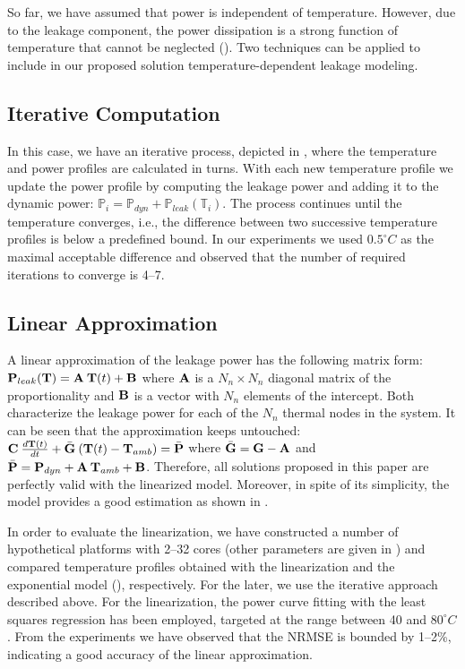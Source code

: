 So far, we have assumed that power is independent of temperature. However, due to the leakage component, the power dissipation is a strong function of temperature that cannot be neglected (). Two techniques can be applied to include in our proposed solution temperature-dependent leakage modeling.

\subsection{Iterative Computation} \label{sec:iterative-leakage}
In this case, we have an iterative process, depicted in , where the temperature and power profiles are calculated in turns. With each new temperature profile we update the power profile by computing the leakage power and adding it to the dynamic power: $\mathbb{P}_i = \mathbb{P}_{dyn} + \mathbb{P}_{leak}(\mathbb{T}_i)$. The process continues until the temperature converges, i.e., the difference between two successive temperature profiles is below a predefined bound. In our experiments we used $0.5^\circ C$ as the maximal acceptable difference and observed that the number of required iterations to converge is 4--7.




\subsection{Linear Approximation} \label{sec:linearized-leakage}
A linear approximation of the leakage power has the following matrix form: $\mathbf{P}_{leak}(\mathbf{T}) = \mathbf{A} \: \mathbf{T}(t) + \mathbf{B}$ where $\mathbf{A}$ is a $N_n \times N_n$ diagonal matrix of the proportionality and $\mathbf{B}$ is a vector with $N_n$ elements of the intercept. Both characterize the leakage power for each of the $N_n$ thermal nodes in the system. It can be seen that the approximation keeps  untouched: $\mathbf{C} \: \frac{d\mathbf{T}(t)}{dt} + \bar{\mathbf{G}} \: (\mathbf{T}(t) - \mathbf{T}_{amb}) = \bar{\mathbf{P}}$ where $\bar{\mathbf{G}} = \mathbf{G} - \mathbf{A}$ and $\bar{\mathbf{P}} = \mathbf{P}_{dyn} + \mathbf{A} \: \mathbf{T}_{amb} + \mathbf{B}$. Therefore, all solutions proposed in this paper are perfectly valid with the linearized model. Moreover, in spite of its simplicity, the model provides a good estimation as shown in \cite{liu2007}.

In order to evaluate the linearization, we have constructed a number of hypothetical platforms with 2--32 cores (other parameters are given in ) and compared temperature profiles obtained with the linearization and the exponential model (), respectively. For the later, we use the iterative approach described above. For the linearization, the power curve fitting with the least squares regression \cite{press2007} has been employed, targeted at the range between 40 and $80^\circ C$. From the experiments we have observed that the NRMSE is bounded by 1--2\%, indicating a good accuracy of the linear approximation.
